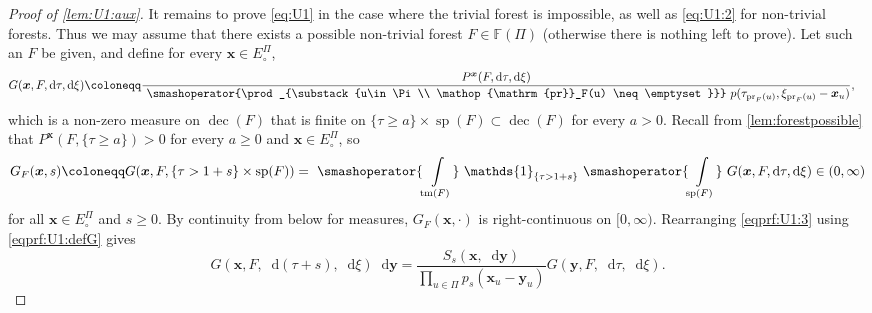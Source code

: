 \documentclass[reqno,draft]{amsart}
\numberwithin{equation}{section}
\theoremstyle{plain}
\theoremstyle{remark}
\newcommand*\diff{\mathop{}\!\mathrm{d}}
\newcommand{\ind}{\mathds{1}}
\DeclareMathOperator{\pr}{pr}
\newcommand{\fpart}{\Pi} %
\DeclareMathOperator{\dcb}{dec}
\DeclareMathOperator{\dct}{tm}
\DeclareMathOperator{\dcs}{sp}
\newcommand{\semi}{S}
\newcommand{\smashop}[1]{\,\,\smashoperator{#1}\,\,}
\begin{document}
\begin{proof}[Proof of \cref{lem:U1:aux}]
    It remains to prove \cref{eq:U1} in the case where the trivial forest is impossible, as well as \cref{eq:U1:2} for non-trivial forests. Thus we may assume that there exists a possible non-trivial forest $F\in \mathbb{F}(\fpart)$ (otherwise there is nothing left to prove). Let such an $F$ be given, and define for every $\boldsymbol x \in E^\fpart_\circ $,
    \begin{align}\label{eqprf:U1:defG}
        G(\boldsymbol x,F,\diff \tau,\diff \xi) &\coloneqq \frac{P^{\boldsymbol x}(F,\diff \tau,\diff \xi)}{\smashop{\prod_{\substack{u\in \fpart\\ \pr_F(u) \neq \emptyset }}}p(\tau_{\pr_F(u)}, \xi_{\pr_F(u)}-\boldsymbol x_u)},
    \end{align}
    which is a non-zero measure on $\dcb(F)$ that is finite on $\{\tau \ge a\} \times \dcs(F) \subset \dcb(F)$ for every $a > 0$. Recall from \cref{lem:forestpossible} that $P^{\boldsymbol x}(F,\{\tau \ge a\}) > 0$ for every $a \ge 0$ and $\boldsymbol x\in E^\fpart_\circ $, so
    \begin{equation*}%
        G_F(\boldsymbol x,s) \coloneqq G(\boldsymbol x,F,\left\{ \tau > 1+s \right\} \times \dcs(F)) = \smashop{\int\limits_{\dct(F)}} \ind_{\left\{ \tau > 1+s \right\} } \smashop{\int\limits_{\dcs(F)}} G(\boldsymbol x,F,\diff \tau,\diff \xi) \in (0,\infty)
    \end{equation*}
    for all $\boldsymbol x\in E^\fpart_\circ $ and $s \ge 0$. By continuity from below for measures, $G_F(\boldsymbol x,\cdot )$ is right-continuous on $[0,\infty)$.
    Rearranging \cref{eqprf:U1:3} using \eqref{eqprf:U1:defG} gives
    \begin{equation}\label{eqprf:U1:4:0}
        G(\boldsymbol x,F,\diff (\tau+s),\diff \xi)  \diff \boldsymbol y = \frac{\semi_s(\boldsymbol x,\diff \boldsymbol y)}{\prod_{u\in \fpart} p_s(\boldsymbol x_u-\boldsymbol y_u)} G(\boldsymbol y,F,\diff \tau,\diff \xi).
    \end{equation}

\end{proof}
\end{document}
